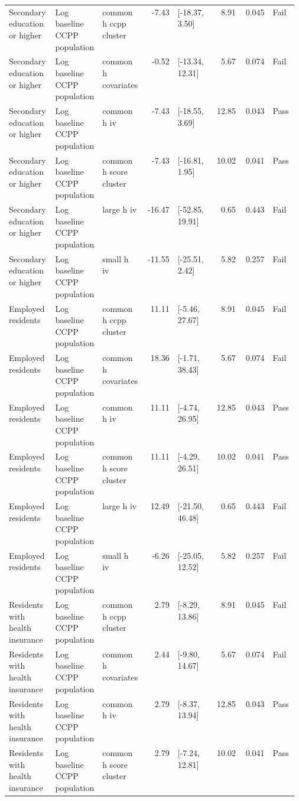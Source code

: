 \begin{longtable}{@{}p{0.16\linewidth}p{0.14\linewidth}p{0.14\linewidth}rp{0.13\linewidth}rrl@{}}
Secondary education or higher & Log baseline CCPP population & common h ccpp cluster & -7.43 & [-18.37, 3.50] & 8.91 & 0.045 & Fail \\
Secondary education or higher & Log baseline CCPP population & common h covariates & -0.52 & [-13.34, 12.31] & 5.67 & 0.074 & Fail \\
Secondary education or higher & Log baseline CCPP population & common h iv & -7.43 & [-18.55, 3.69] & 12.85 & 0.043 & Pass \\
Secondary education or higher & Log baseline CCPP population & common h score cluster & -7.43 & [-16.81, 1.95] & 10.02 & 0.041 & Pass \\
Secondary education or higher & Log baseline CCPP population & large h iv & -16.47 & [-52.85, 19.91] & 0.65 & 0.443 & Fail \\
Secondary education or higher & Log baseline CCPP population & small h iv & -11.55 & [-25.51, 2.42] & 5.82 & 0.257 & Fail \\
Employed residents & Log baseline CCPP population & common h ccpp cluster & 11.11 & [-5.46, 27.67] & 8.91 & 0.045 & Fail \\
Employed residents & Log baseline CCPP population & common h covariates & 18.36 & [-1.71, 38.43] & 5.67 & 0.074 & Fail \\
Employed residents & Log baseline CCPP population & common h iv & 11.11 & [-4.74, 26.95] & 12.85 & 0.043 & Pass \\
Employed residents & Log baseline CCPP population & common h score cluster & 11.11 & [-4.29, 26.51] & 10.02 & 0.041 & Pass \\
Employed residents & Log baseline CCPP population & large h iv & 12.49 & [-21.50, 46.48] & 0.65 & 0.443 & Fail \\
Employed residents & Log baseline CCPP population & small h iv & -6.26 & [-25.05, 12.52] & 5.82 & 0.257 & Fail \\
Residents with health insurance & Log baseline CCPP population & common h ccpp cluster & 2.79 & [-8.29, 13.86] & 8.91 & 0.045 & Fail \\
Residents with health insurance & Log baseline CCPP population & common h covariates & 2.44 & [-9.80, 14.67] & 5.67 & 0.074 & Fail \\
Residents with health insurance & Log baseline CCPP population & common h iv & 2.79 & [-8.37, 13.94] & 12.85 & 0.043 & Pass \\
Residents with health insurance & Log baseline CCPP population & common h score cluster & 2.79 & [-7.24, 12.81] & 10.02 & 0.041 & Pass \\

\end{longtable}
